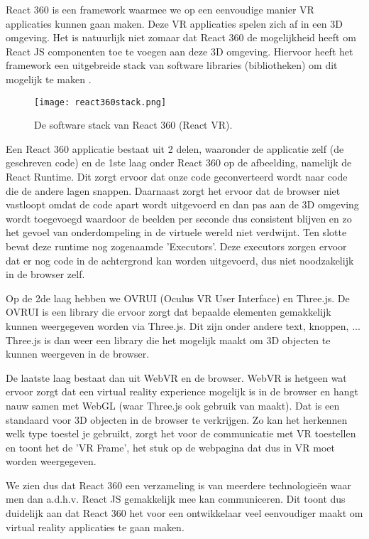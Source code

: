 React 360 is een framework waarmee we op een eenvoudige manier VR applicaties kunnen gaan maken. Deze VR applicaties spelen zich af in een 3D omgeving. Het is natuurlijk niet zomaar dat React 360 de mogelijkheid heeft om React JS componenten toe te voegen aan deze 3D omgeving. Hiervoor heeft het framework een uitgebreide stack van software libraries (bibliotheken) om dit mogelijk te maken \autocite{Bieronski2016}.

\begin{figure}[H]
	\centering
	\texttt{[image: react360stack.png]}
	\caption{De software stack van React 360 (React VR).}
	\label{fig:react360-stack}
\end{figure}

Een React 360 applicatie bestaat uit 2 delen, waaronder de applicatie zelf (de geschreven code) en de 1ste laag onder React 360 op de afbeelding,  namelijk de React Runtime. Dit zorgt ervoor dat onze code geconverteerd wordt naar code die de andere lagen snappen. Daarnaast zorgt het ervoor dat de browser niet vastloopt omdat de code apart wordt uitgevoerd en dan pas aan de 3D omgeving wordt toegevoegd waardoor de beelden per seconde dus consistent blijven en zo het gevoel van onderdompeling in de virtuele wereld niet verdwijnt. Ten slotte bevat deze runtime nog zogenaamde 'Executors'. Deze executors zorgen ervoor dat er nog code in de achtergrond kan worden uitgevoerd, dus niet noodzakelijk in de browser zelf.

Op de 2de laag hebben we OVRUI (Oculus VR User Interface) en Three.js. De OVRUI is een library die ervoor zorgt dat bepaalde elementen gemakkelijk kunnen weergegeven worden via Three.js. Dit zijn onder andere text, knoppen, ... Three.js is dan weer een library die het mogelijk maakt om 3D objecten te kunnen weergeven in de browser.

De laatste laag bestaat dan uit WebVR en de browser. WebVR is hetgeen wat ervoor zorgt dat een virtual reality experience mogelijk is in de browser en hangt nauw samen met WebGL (waar Three.js ook gebruik van maakt). Dat is een standaard voor 3D objecten in de browser te verkrijgen. Zo kan het herkennen welk type toestel je gebruikt, zorgt het voor de communicatie met VR toestellen en toont het de 'VR Frame', het stuk op de webpagina dat dus in VR moet worden weergegeven. 

We zien dus dat React 360 een verzameling is van meerdere technologieën waar men dan a.d.h.v. React JS gemakkelijk mee kan communiceren. Dit toont dus duidelijk aan dat React 360 het voor een ontwikkelaar veel eenvoudiger maakt om virtual reality applicaties te gaan maken.

